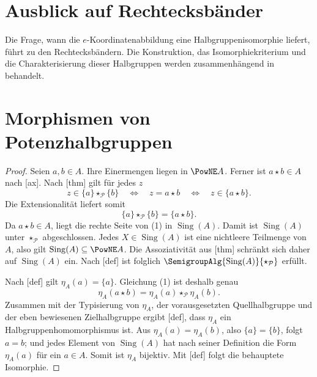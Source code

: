 \documentclass[main.tex]{subfiles}
\begin{document}
\section{Ausblick auf Rechtecksbänder}

Die Frage, wann die \(e\)-Koordinatenabbildung eine
Halbgruppenisomorphie liefert, führt zu den Rechtecksbändern. Die
Konstruktion, das Isomorphiekriterium und die Charakterisierung dieser
Halbgruppen werden zusammenhängend in
\CoordinatesMainLink{}
behandelt.

\section{Morphismen von Potenzhalbgruppen}

\begin{proof}
Seien \(a,b\in A\). Ihre Einermengen liegen in \(\PowNE A\). Ferner ist
\(a\star b\in A\) nach [ax]. Nach
[thm] gilt für jedes \(z\)
\[
  z\in\{a\}\star_{\mathcal P}\{b\}
  \quad\Longleftrightarrow\quad
  z=a\star b
  \quad\Longleftrightarrow\quad
  z\in\{a\star b\}.
\]
Die Extensionalität liefert somit
\[
  \{a\}\star_{\mathcal P}\{b\}=\{a\star b\}.       \tag{1}
\]
Da \(a\star b\in A\), liegt die rechte Seite von (1) in
\(\operatorname{Sing}(A)\). Damit ist
\(\operatorname{Sing}(A)\) unter \(\star_{\mathcal P}\) abgeschlossen.
Jedes \(X\in\operatorname{Sing}(A)\) ist eine nichtleere Teilmenge von
\(A\), also gilt \(\operatorname{Sing}(A)\subseteq\PowNE A\). Die
Assoziativität aus [thm] schränkt sich
daher auf \(\operatorname{Sing}(A)\) ein. Nach
[def] ist folglich
\(\SemigroupAlg{\operatorname{Sing}(A)}{\star_{\mathcal P}}\) erfüllt.

Nach [def] gilt
\(\eta_A(a)=\{a\}\). Gleichung (1) ist deshalb genau
\[
  \eta_A(a\star b)
   =\eta_A(a)\star_{\mathcal P}\eta_A(b).
\]
Zusammen mit der Typisierung von \(\eta_A\), der vorausgesetzten
Quellhalbgruppe und der eben bewiesenen Zielhalbgruppe ergibt
[def], dass \(\eta_A\) ein
Halbgruppenhomomorphismus ist. Aus \(\eta_A(a)=\eta_A(b)\), also
\(\{a\}=\{b\}\), folgt \(a=b\); und jedes Element von
\(\operatorname{Sing}(A)\) hat nach seiner Definition die Form \(\eta_A(a)\)
für ein \(a\in A\). Somit ist \(\eta_A\) bijektiv. Mit
[def] folgt die behauptete Isomorphie.
\end{proof}
\end{document}
